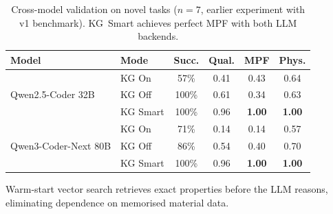 \begin{table}[t]
\centering
\caption{Cross-model validation on novel tasks ($n{=}7$, earlier
  experiment with v1 benchmark).  KG~Smart achieves perfect MPF with
  both LLM backends.}
\label{tab:multi-model}
\footnotesize
\setlength{\tabcolsep}{3pt}
\begin{tabular}{@{}llcccc@{}}
\toprule
Model & Mode & Succ. & Qual. & MPF & Phys. \\
\midrule
\multirow{3}{*}{Qwen2.5-Coder 32B}
  & KG On    & 57\% & 0.41 & 0.43 & 0.64 \\
  & KG Off   & 100\% & 0.61 & 0.34 & 0.63 \\
  & KG Smart & 100\% & 0.96 & \textbf{1.00} & \textbf{1.00} \\
\midrule
\multirow{3}{*}{Qwen3-Coder-Next 80B}
  & KG On    &  71\% & 0.14 & 0.14 & 0.57 \\
  & KG Off   &  86\% & 0.54 & 0.40 & 0.70 \\
  & KG Smart & 100\% & 0.96 & \textbf{1.00} & \textbf{1.00} \\
\bottomrule
\end{tabular}

\vspace{0.3em}
{\scriptsize Warm-start vector search retrieves exact properties before the
LLM reasons, eliminating dependence on memorised material data.}
\end{table}
